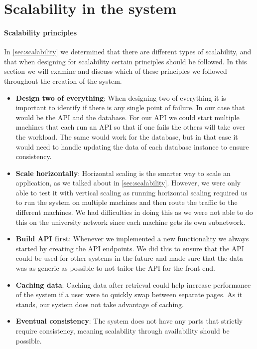 \section{Scalability in the system}
\paragraph{Scalability principles}
In \autoref{sec:scalability} we determined that there are different types of scalability, and that when designing for scalability certain principles should be followed.
In this section we will examine and discuss which of these principles we followed throughout the creation of the system.

\begin{itemize}
    \item \textbf{Design two of everything}: When designing two of everything it is important to identify if there is any single point of failure.
    In our case that would be the API and the database.
    For our API we could start multiple machines that each run an API so that if one fails the others will take over the workload.
    The same would work for the database, but in that case it would need to handle updating the data of each database instance to ensure consistency.
    \item \textbf{Scale horizontally}: Horizontal scaling is the smarter way to scale an application, as we talked about in \autoref{sec:scalability}.
    However, we were only able to test it with vertical scaling as running horizontal scaling required us to run the system on multiple machines and then route the traffic to the different machines.
    We had difficulties in doing this as we were not able to do this on the university network since each machine gets its own subnetwork.
    \item \textbf{Build API first}: Whenever we implemented a new functionality we always started by creating the API endpoints.
    We did this to ensure that the API could be used for other systems in the future and made sure that the data was as generic as possible to not tailor the API for the front end. 
    \item \textbf{Caching data}: Caching data after retrieval could help increase performance of the system if a user were to quickly swap between separate pages. 
    As it stands, our system does not take advantage of caching.
    \item \textbf{Eventual consistency}: The system does not have any parts that strictly require consistency, meaning scalability through availability should be possible. 

\end{itemize}
